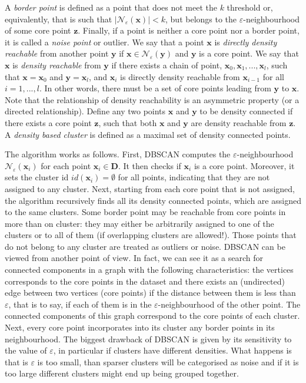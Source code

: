 \documentclass[a4paper]{article}
\begin{document}
	A \textit{border point} is defined as a point that does not meet the $k$ threshold or, equivalently, that is such that $|\mathcal{N}_{\varepsilon}(\boldsymbol{x})| < k$, but belongs to the $\varepsilon$-neighbourhood of some core point $\boldsymbol{z}$.
	Finally, if a point is neither a core point nor a border point, it is called a \textit{noise point} or outlier.
	We say that a point $\boldsymbol{x}$ is \textit{directly density reachable} from another point $\boldsymbol{y}$ if $\boldsymbol{x} \in \mathcal{N}_{\varepsilon} \left( \boldsymbol{y} \right)$ and $\boldsymbol{y}$ is a core point.
	We say that $\boldsymbol{x}$ is \textit{density reachable} from $\boldsymbol{y}$ if there exists a chain of point, $\boldsymbol{x}_{0}, \boldsymbol{x}_{1}, ..., \boldsymbol{x}_{l}$, such that $\boldsymbol{x}=\boldsymbol{x}_{0}$ and $\boldsymbol{y} = \boldsymbol{x}_{l}$, and $\boldsymbol{x}_{i}$ is directly density reachable from $\boldsymbol{x}_{i-1}$ for all $i=1,...,l$.
	In other words, there must be a set of core points leading from $\boldsymbol{y}$ to $\boldsymbol{x}$. Note that the relationship of density reachability is an asymmetric property (or a directed relationship).
	Define any two points $\boldsymbol{x}$ and $\boldsymbol{y}$ to be density connected if there exists a core point $\boldsymbol{z}$, such that both $\boldsymbol{x}$ and $\boldsymbol{y}$ are density reachable from $\boldsymbol{z}$.
	A \textit{density based cluster} is defined as a maximal set of density connected points.

	The algorithm works as follows. First, DBSCAN computes the $\varepsilon$-neighbourhood $\mathcal{N}_{\varepsilon} \left( \boldsymbol{x}_{i} \right)$ for each point $\boldsymbol{x}_{i} \in \boldsymbol{D}$. It then checks if $\boldsymbol{x}_{i}$ is a core point. Moreover, it sets the cluster id $id\left(\boldsymbol{x}_{i}\right) = \emptyset$ for all points, indicating that they are not assigned to any cluster.
	Next, starting from each core point that is not assigned, the algorithm recursively finds all its density connected points, which are assigned to the same clusters. Some border point may be reachable from core points in more than on cluster: they may either be arbitrarily assigned to one of the clusters or to all of them (if overlapping clusters are allowed!).
	Those points that do not belong to any cluster are treated as outliers or noise.
	DBSCAN can be viewed from another point of view. In fact, we can see it as a search for connected components in a graph with the following characteristics: the vertices corresponds to the core points in the dataset and there exists an (undirected) edge between two vertices (core points) if the distance between them is less than $\varepsilon$, that is to say, if each of them is in the $\varepsilon$-neighbourhood of the other point.
	The connected components of this graph correspond to the core points of each cluster. Next, every core point incorporates into its cluster any border points in its neighbourhood.
	The biggest drawback of DBSCAN is given by its sensitivity to the value of $\varepsilon$, in particular if clusters have different densities. What happens is that is $\varepsilon$ is too small, than sparser clusters will be categorised as noise and if it is too large different clusters might end up being grouped together.
\end{document}
